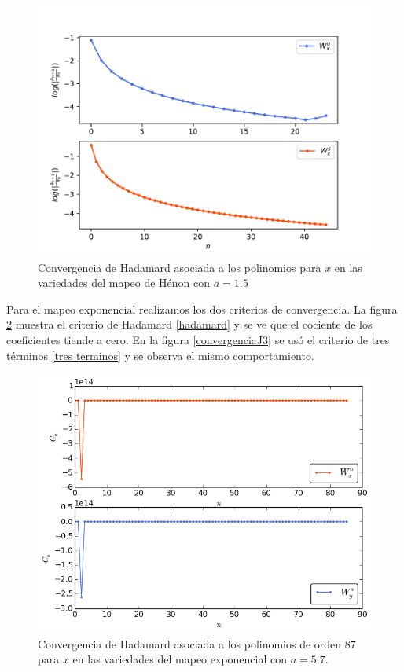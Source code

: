 \begin{figure}[H]
\centering
\includegraphics[scale=0.6]{converHenon1}
\caption{Convergencia de Hadamard asociada a los polinomios para $x$ en las variedades del mapeo de Hénon con $a=1.5$}
\label{convergenciaHenon1}
\end{figure}


Para el mapeo exponencial realizamos los dos criterios de convergencia. La figura \ref{convergenciaJH} muestra el criterio de Hadamard \ref{hadamard} y se ve que el cociente de los coeficientes tiende a cero. En la figura \ref{convergenciaJ3} se usó el criterio de tres términos \ref{tres terminos} y se observa el mismo comportamiento. 

\begin{figure}[H]
\centering
\includegraphics[scale=0.5]{convergenciaJungH}
\caption{Convergencia de Hadamard asociada a los polinomios de orden $87$ para $x$ en las variedades del mapeo exponencial con $a=5.7$.}
\label{convergenciaJH}
\end{figure}


